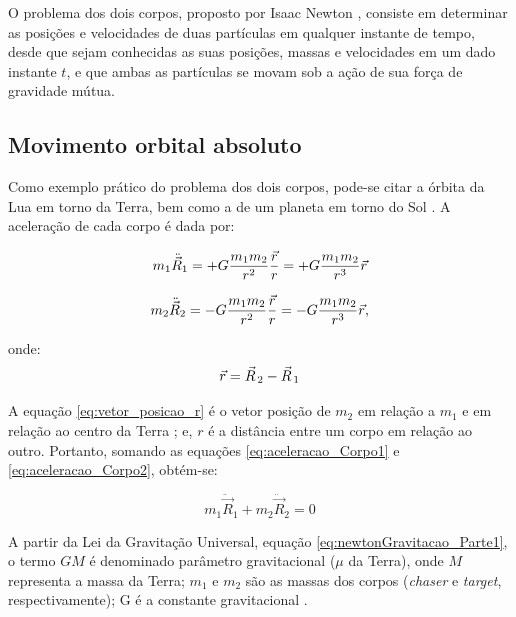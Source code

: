 O problema dos dois corpos, proposto por Isaac Newton \cite{newton1713}, consiste em determinar as posições e velocidades de duas partículas em qualquer instante de tempo, desde que sejam conhecidas as suas posições, massas e velocidades em um dado instante $t$, e que ambas as partículas se movam sob a ação de sua força de gravidade mútua.

\subsection{Movimento orbital absoluto}
\label{sec:movimento_orbital_absoluto}
Como exemplo prático do problema dos dois corpos, pode-se citar a órbita da Lua em torno da Terra, bem como a de um planeta em torno do Sol \cite{wgsantos2011}.
A aceleração de cada corpo é dada por:

\begin{equation}
\label{eq:aceleracao_Corpo1}
m_1 \ddot{\vec R}_1 =
+ G \frac{m_1m_2}{r^2} \frac{\vec{r}}{r} =
+ G \frac{m_1m_2}{r^3} {\vec{r}}
\end{equation}

\begin{equation}
\label{eq:aceleracao_Corpo2}
m_2 \ddot{\vec R}_2 =
- G \frac{m_1m_2}{r^2} \frac{\vec{r}}{r} =
- G \frac{m_1m_2}{r^3} {\vec{r}},
\end{equation}

onde:
\begin{equation}
    \label{eq:vetor_posicao_r}
\vec{r} = \vec R_{\, 2} - \vec R_{\, 1}
\end{equation}

A equação \eqref{eq:vetor_posicao_r} é o vetor posição de $m_2$ em relação a $m_1$ e em relação ao centro da Terra \cite{wie2008space}; e, $r$ é a distância entre um corpo em relação ao outro. Portanto, somando as equações \eqref{eq:aceleracao_Corpo1} e \eqref{eq:aceleracao_Corpo2}, obtém-se:

\begin{equation}
\label{eq:somaAceleracao_Corpo1e2}
m_1 \ddot{\vec R}_1 + m_2 \ddot{\vec R}_2 = 0
\end{equation}

A partir da Lei da Gravitação Universal, equação \eqref{eq:newtonGravitacao_Parte1}, o termo $G M$ é denominado parâmetro gravitacional ($\mu$ da Terra), onde $M$ representa a massa da Terra; $m_1$ e $m_2$ são as massas dos corpos (\textit{chaser} e \textit{target}, respectivamente); G é a constante gravitacional \cite{halliday2013,wie2008space}.

